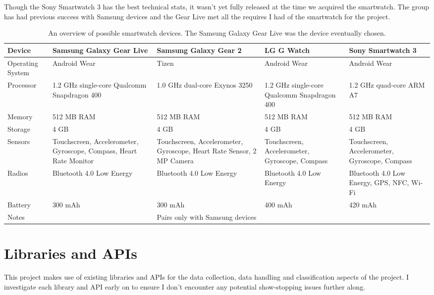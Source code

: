       Though the Sony Smartwatch 3 has the best technical stats, it wasn't yet fully released at the time we acquired the smartwatch. The group has had previous success with Samsung devices and the Gear Live met all the requires I had of the smartwatch for the project.
      \begin{table}
        \centering
        {\tabulinesep=1.2mm
        \begin{tabu} to 
          Device & \textbf{Samsung Galaxy Gear Live} & \textbf{Samsung Galaxy Gear 2} &\textbf{ LG G Watch} & \textbf{Sony Smartwatch 3} \\
          \hline
          Operating System & Android Wear & Tizen & Android Wear & Android Wear \\
          \hline
          Processor & 1.2 GHz single-core Qualcomm Snapdragon 400 & 1.0 GHz dual-core Exynos 3250 & 1.2 GHz single-core Qualcomm Snapdragon 400 & 1.2 GHz quad-core ARM A7 \\
          \hline
          Memory & 512 MB RAM & 512 MB RAM & 512 MB RAM & 512 MB RAM \\
          \hline
          Storage & 4 GB & 4 GB & 4 GB & 4 GB \\
          \hline
          Sensors & Touchscreen, Accelerometer, Gyroscope, Compass, Heart Rate Monitor & Touchscreen, Accelerometer, Gyroscope, Heart Rate Sensor, 2 MP Camera & Touchscreen, Accelerometer, Gyroscope, Compass & Touchscreen, Accelerometer, Gyroscope, Compass \\
          \hline
          Radios & Bluetooth 4.0 Low Energy & Bluetooth 4.0 Low Energy & Bluetooth 4.0 Low Energy & Bluetooth 4.0 Low Energy, GPS, NFC, Wi-Fi \\
          \hline
          Battery & 300 mAh & 300 mAh & 400 mAh & 420 mAh \\
          \hline
          Notes &  & Pairs only with Samsung devices &  & \\
          \hline
          
        \end{tabu}}
        \caption{An overview of possible smartwatch devices. The Samsung Galaxy Gear Live was the device eventually chosen.}
        \label{tab:smartwatch-features}
      \end{table}
    
  \section{Libraries and APIs}
      This project makes use of existing libraries and APIs for the data collection, data handling
      and classification aspects of the project. I investigate each library and API early on to ensure I don't encounter any potential show-stopping issues further along. 
    
